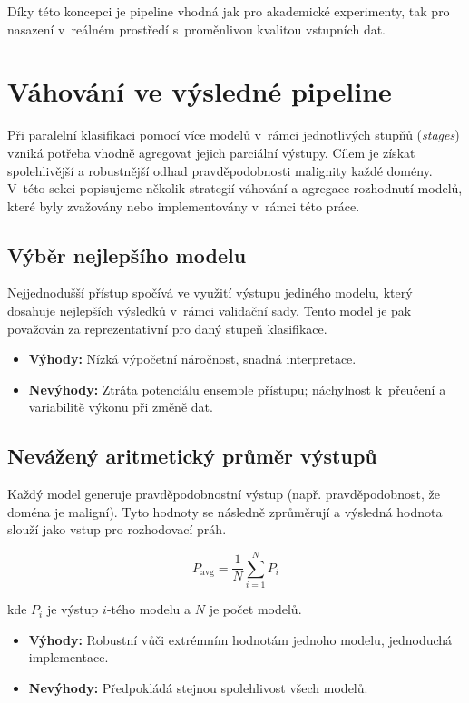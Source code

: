 Díky této koncepci je pipeline vhodná jak pro akademické experimenty, tak pro nasazení v~reálném prostředí s~proměnlivou kvalitou vstupních dat.

\section{Váhování ve výsledné pipeline}
\label{sec:model_weighting}

Při paralelní klasifikaci pomocí více modelů v~rámci jednotlivých stupňů (\textit{stages}) vzniká potřeba vhodně agregovat jejich parciální výstupy. Cílem je získat spolehlivější a robustnější odhad pravděpodobnosti malignity každé domény. V~této sekci popisujeme několik strategií váhování a agregace rozhodnutí modelů, které byly zvažovány nebo implementovány v~rámci této práce.

\subsection{Výběr nejlepšího modelu}

Nejjednodušší přístup spočívá ve využití výstupu jediného modelu, který dosahuje nejlepších výsledků v~rámci validační sady. Tento model je pak považován za reprezentativní pro daný stupeň klasifikace.

\begin{itemize}
    \item \textbf{Výhody:} Nízká výpočetní náročnost, snadná interpretace.
    \item \textbf{Nevýhody:} Ztráta potenciálu ensemble přístupu; náchylnost k~přeučení a variabilitě výkonu při změně dat.
\end{itemize}

\subsection{Nevážený aritmetický průměr výstupů}

Každý model generuje pravděpodobnostní výstup (např. pravděpodobnost, že doména je maligní). Tyto hodnoty se následně zprůměrují a výsledná hodnota slouží jako vstup pro rozhodovací práh.

\[
P_{\text{avg}} = \frac{1}{N} \sum_{i=1}^{N} P_i
\]

kde $P_i$ je výstup $i$-tého modelu a $N$ je počet modelů.

\begin{itemize}
    \item \textbf{Výhody:} Robustní vůči extrémním hodnotám jednoho modelu, jednoduchá implementace.
    \item \textbf{Nevýhody:} Předpokládá stejnou spolehlivost všech modelů.
\end{itemize}

